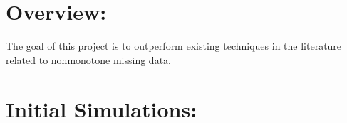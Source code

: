 \documentclass[12pt]{article}
\begin{document}

\section*{Overview:}

The goal of this project is to outperform existing techniques in the literature
related to nonmonotone missing data.

\section*{Initial Simulations:}
\end{document}
